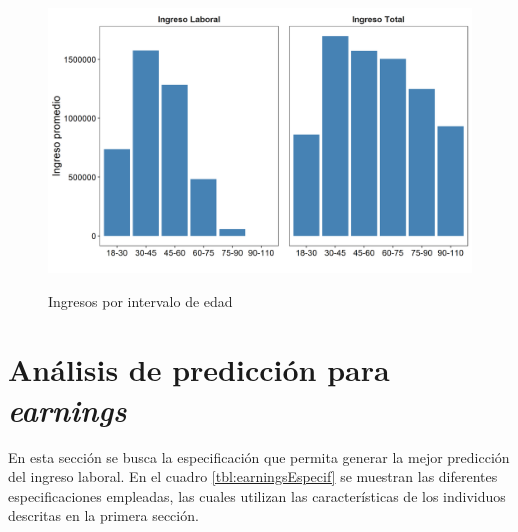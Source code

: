 \documentclass[11pt,a4paper]{article}
\begin{document}
\begin{figure}[H]
    \centering
        \caption{Ingresos por intervalo de edad}
    \includegraphics[width=\textwidth]{../views/ingresos_edad.png}
    \label{fig:ingresos_edad}
\end{figure}

\section{Análisis de predicción para \emph{earnings}}

En esta sección se busca la especificación que permita generar la mejor predicción del ingreso laboral.
En el cuadro \ref{tbl:earningsEspecif} se muestran las diferentes especificaciones empleadas, las cuales utilizan las características de los individuos descritas en la primera sección.
\end{document}

